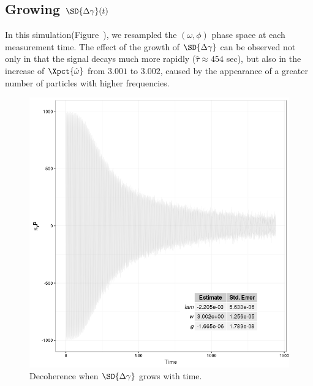 \documentclass{article}
\begin{document}
\subsection{Growing $\SD{\dy}(t)$}
In this simulation(Figure~), we resampled the $(\omega,\phi)$ phase space at each measurement time. The effect of the growth of $\SD{\dy}$ can be observed not only in that the signal decays much more rapidly ($\hat{\tau}\approx 454$ sec), but also in the increase of $\Xpct{\hat{\omega}}$ from $3.001$ to $3.002$, caused by the appearance of a greater number of particles with higher frequencies.
\begin{figure}[h]
	\centering
	\includegraphics[scale=.6]{../img/Signal_Growing_Dgamma}
	\caption{Decoherence when $\SD{\dy}$ grows with time.}
\end{figure}
\end{document}
